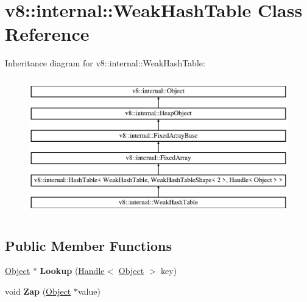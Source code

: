 \hypertarget{classv8_1_1internal_1_1_weak_hash_table}{}\section{v8\+:\+:internal\+:\+:Weak\+Hash\+Table Class Reference}
\label{classv8_1_1internal_1_1_weak_hash_table}
Inheritance diagram for v8\+:\+:internal\+:\+:Weak\+Hash\+Table\+:\begin{figure}[H]
\begin{center}
\leavevmode
\includegraphics[height=6.000000cm]{classv8_1_1internal_1_1_weak_hash_table}
\end{center}
\end{figure}
\subsection*{Public Member Functions}
\begin{DoxyCompactItemize}
\item 
\hypertarget{classv8_1_1internal_1_1_weak_hash_table_abef1d5b78a1577bdeb0aa082a15d9c9b}{}\hyperlink{classv8_1_1internal_1_1_object}{Object} $\ast$ {\bfseries Lookup} (\hyperlink{classv8_1_1internal_1_1_handle}{Handle}$<$ \hyperlink{classv8_1_1internal_1_1_object}{Object} $>$ key)\label{classv8_1_1internal_1_1_weak_hash_table_abef1d5b78a1577bdeb0aa082a15d9c9b}

\item 
\hypertarget{classv8_1_1internal_1_1_weak_hash_table_a1ca967ae71e4b8765139148b06cb536d}{}void {\bfseries Zap} (\hyperlink{classv8_1_1internal_1_1_object}{Object} $\ast$value)\label{classv8_1_1internal_1_1_weak_hash_table_a1ca967ae71e4b8765139148b06cb536d}

\end{DoxyCompactItemize}
